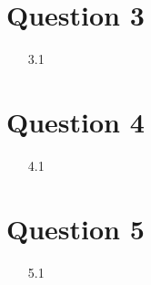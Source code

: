 \documentclass[10pt,a4paper]{article}
\begin{document}
\section{Question 3}
\begin{enumerate}[leftmargin=\labelsep]
\item[3.1]
\end{enumerate}

\section{Question 4}
\begin{enumerate}[leftmargin=\labelsep]
\item[4.1]
\end{enumerate}

\section{Question 5}
\begin{enumerate}[leftmargin=\labelsep]
\item[5.1]
\end{enumerate}
\end{document}
